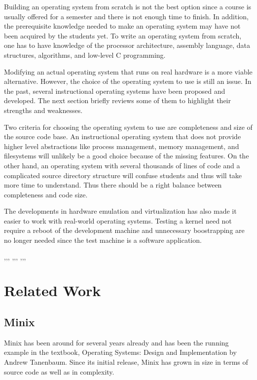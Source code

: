 \documentclass{acm_proc_article-sp}
\begin{document}
Building an operating system from scratch is not the best option since a course
is usually offered for a semester and there is not enough time to finish. In 
addition, the prerequisite knowledge needed to make an operating system may have
not been acquired by the students yet. To write an operating system from 
scratch, one has to have knowledge of the processor architecture, assembly
language, data structures, algorithms, and low-level C programming.

Modifying an actual operating system that runs on real hardware is a more
viable alternative. However, the choice of the operating system to use is
still an issue. In the past, several instructional operating systems have been
proposed and developed. The next section briefly reviews some of them 
to highlight their strengths and weaknesses.

Two criteria for choosing the operating system to use are completeness 
and size of the source code base. An instructional operating system that does
not provide higher level abstractions like process management, 
memory management, and filesystems will unlikely be a good choice because
of the missing features. On the other hand, an operating system with several 
thousands of lines of code and a complicated source directory structure will
confuse students and thus will take more time to understand. Thus there should
be a right balance between completeness and code size.

The developments in hardware emulation and virtualization has also made it 
easier to work with real-world operating systems. Testing a kernel need not
require a reboot of the development machine and unnecessary boostrapping are
no longer needed since the test machine is a software application.
 


\cite{silberschatz:osc},\cite{tanenbaum:osdai},\cite{dayo:dexos},
\cite{claypool:fossil},\cite{christopher:nachos},\cite{gary:nachos},
\cite{tanenbaum:minix},\cite{black:osfs},\cite{hovemeyer:geekos},
\cite{anderson:survey}


\section{Related Work}

\subsection{Minix}
Minix has been around for several years already and has been the running 
example in the textbook, Operating Systems: Design and Implementation by 
Andrew Tanenbaum. Since its initial release, Minix has grown in size in terms
of source code as well as in complexity. 
\end{document}
